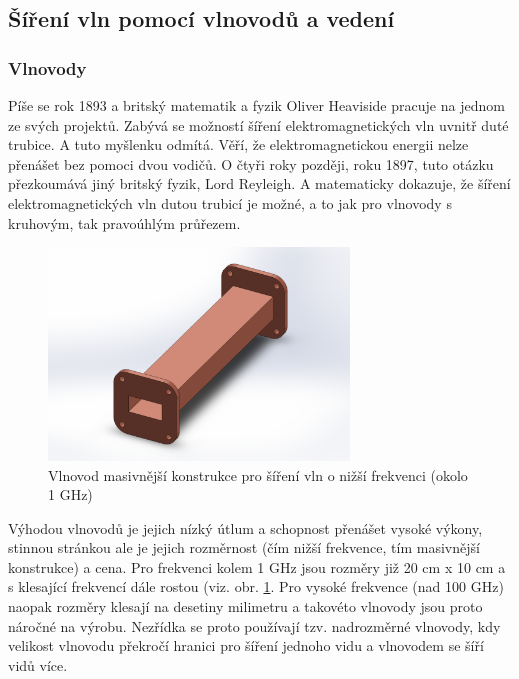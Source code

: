\documentclass[12pt,a4paper,oneside]{article}
\numberwithin{equation}{section} %
\numberwithin{figure}{section} %
\numberwithin{table}{section} %
\begin{document}
 


\newpage
\subsection{Šíření vln pomocí vlnovodů a vedení}
\subsubsection{Vlnovody}
Píše se rok 1893 a britský matematik a fyzik Oliver Heaviside pracuje na jednom ze svých projektů. Zabývá se možností šíření elektromagnetických vln uvnitř duté trubice. A tuto myšlenku odmítá. Věří, že elektromagnetickou energii nelze přenášet bez pomoci dvou vodičů. O čtyři roky později, roku 1897, tuto otázku přezkoumává jiný britský fyzik, Lord Reyleigh. A matematicky dokazuje, že šíření elektromagnetických vln dutou trubicí je možné, a to jak pro vlnovody s kruhovým, tak pravoúhlým průřezem.

\begin{figure}[h] 
\begin{center}
\includegraphics[width=8cm]{vlnovod.pdf}
\caption{Vlnovod masivnější konstrukce pro šíření vln o nižší frekvenci (okolo 1 GHz)}
\label{vlnovod}
\end{center}
\end{figure}

Výhodou vlnovodů je jejich nízký útlum a schopnost přenášet vysoké výkony, stinnou stránkou ale je jejich rozměrnost (čím nižší frekvence, tím masivnější konstrukce) a cena. Pro frekvenci kolem 1 GHz jsou rozměry již 20 cm x 10 cm a s klesající frekvencí dále rostou (viz. obr. \ref{vlnovod}. Pro vysoké frekvence (nad 100 GHz) naopak rozměry klesají na desetiny milimetru a takovéto vlnovody jsou proto náročné na výrobu. Nezřídka se proto používají tzv. nadrozměrné vlnovody, kdy velikost vlnovodu překročí hranici pro šíření jednoho vidu a vlnovodem se šíří vidů více. 
\end{document}
